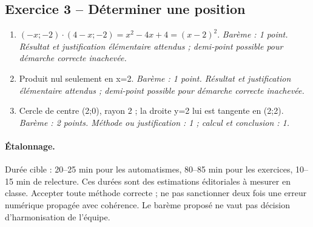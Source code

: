 \subsection*{Exercice 3 -- Déterminer une position}
\begin{enumerate}
\item $(-x;-2)\cdot(4-x;-2)=x^2-4x+4=(x-2)^2$. \textit{Barème : 1 point. Résultat et justification élémentaire attendus ; demi-point possible pour démarche correcte inachevée.}
\item Produit nul seulement en x=2. \textit{Barème : 1 point. Résultat et justification élémentaire attendus ; demi-point possible pour démarche correcte inachevée.}
\item Cercle de centre (2;0), rayon 2 ; la droite y=2 lui est tangente en (2;2). \textit{Barème : 2 points. Méthode ou justification : 1 ; calcul et conclusion : 1.}
\end{enumerate}
\paragraph{Étalonnage.} Durée cible : 20–25 min pour les automatismes, 80–85 min pour les exercices, 10–15 min de relecture. Ces durées sont des estimations éditoriales à mesurer en classe. Accepter toute méthode correcte ; ne pas sanctionner deux fois une erreur numérique propagée avec cohérence. Le barème proposé ne vaut pas décision d’harmonisation de l’équipe.
